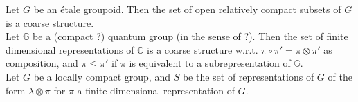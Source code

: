 Let $G$ be an étale groupoid. Then the set of open relatively compact subsets of $G$ is a coarse structure. \\

Let $\mathbb G$ be a (compact ?) quantum group (in the sense of ?). Then the set of finite dimensional representations of $\mathbb G$ is a coarse structure w.r.t. $\pi\circ \pi'=\pi\otimes \pi'$ as composition, and $\pi\leq\pi'$ if $\pi$ is equivalent to a subrepresentation of $\mathbb G$.\\

Let $G$ be a locally compact group, and $S$ be the set of representations of $G$ of the form $\lambda\otimes\pi$ for $\pi$ a finite dimensional representation of $G$.   


































